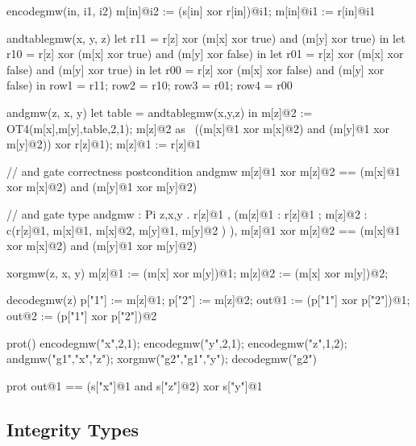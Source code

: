 \begin{verbatimtab}
    encodegmw(in, i1, i2) {
      m[in]@i2 := (s[in] xor r[in])@i1;
      m[in]@i1 := r[in]@i1
    }
    
    andtablegmw(x, y, z) {
      let r11 = r[z] xor (m[x] xor true) and (m[y] xor true) in
      let r10 = r[z] xor (m[x] xor true) and (m[y] xor false) in
      let r01 = r[z] xor (m[x] xor false) and (m[y] xor true) in
      let r00 = r[z] xor (m[x] xor false) and (m[y] xor false) in
      { row1 = r11; row2 = r10; row3 = r01; row4 = r00 }
    }
    
    andgmw(z, x, y) {
      let table = andtablegmw(x,y,z) in
      m[z]@2 := OT4(m[x],m[y],table,2,1);
      m[z]@2 as ~((m[x]@1 xor m[x]@2) and (m[y]@1 xor m[y]@2)) xor r[z]@1);
      m[z]@1 := r[z]@1
    }

    // and gate correctness postcondition
    {} andgmw { m[z]@1 xor m[z]@2 == (m[x]@1 xor m[x]@2) and (m[y]@1 xor m[y]@2) }

    // and gate type
    andgmw :
     Pi z,x,y .
     {}
     { { r[z]@1 },
       (m[z]@1 : { r[z]@1 }; m[z]@2 : {c(r[z]@1, { m[x]@1, m[x]@2, m[y]@1, m[y]@2 })} ),
       m[z]@1 xor m[z]@2 == (m[x]@1 xor m[x]@2) and (m[y]@1 xor m[y]@2)}
    
    xorgmw(z, x, y) {
      m[z]@1 := (m[x] xor m[y])@1; m[z]@2 := (m[x] xor m[y])@2;
    }
    
    decodegmw(z) {
      p["1"] := m[z]@1; p["2"] := m[z]@2;
      out@1 := (p["1"] xor p["2"])@1;
      out@2 := (p["1"] xor p["2"])@2
    }

    prot() {
      encodegmw("x",2,1);
      encodegmw("y",2,1);
      encodegmw("z",1,2);
      andgmw("g1","x","z");
      xorgmw("g2","g1","y");
      decodegmw("g2")
    }

    {} prot { out@1 == (s["x"]@1 and s["z"]@2) xor s["y"]@1 }
\end{verbatimtab}

\subsection{Integrity Types}

